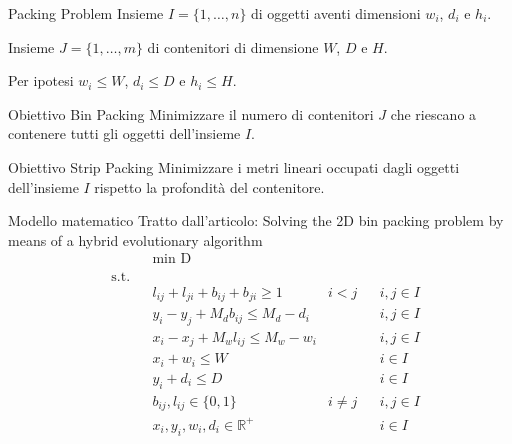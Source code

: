 \documentclass{beamer}
\begin{document}
\begin{frame}{Packing Problem}
	Insieme $I = \{1,\dots,n\}$ di oggetti aventi dimensioni $w_{i}$, $d_{i}$ e $h_{i}$.	
															
	Insieme $J = \{1,\dots,m\}$ di contenitori di dimensione $W$, $D$ e $H$.
													
	Per ipotesi $w_{i} \leq W$, $d_{i} \leq D$ e $h_{i} \leq H$.
	\vspace{.5em}
	\begin{minipage}[c]{0.45\textwidth}
		\begin{alertblock}{Obiettivo Bin Packing}
			Minimizzare il numero di contenitori $J$ che riescano a contenere tutti gli oggetti dell'insieme $I$.
		\end{alertblock}	
	\end{minipage}
	\hfill
	\begin{minipage}[c]{0.45\textwidth}
		\begin{alertblock}{Obiettivo Strip Packing}
			Minimizzare i metri lineari occupati dagli oggetti dell'insieme $I$ rispetto la profondit\`a del contenitore.
		\end{alertblock}	
	\end{minipage}
\end{frame}


\begin{frame}{Modello matematico}
	Tratto dall'articolo: Solving the 2D bin packing problem by means of a hybrid evolutionary algorithm
	\begin{align*}
		& & &\underset{}{\text{min D}} \\
		& \text{s.t.} \\
		  &   &   & l_{ij} + l_{ji} + b_{ij} + b_{ji} \geq 1      & i < j    &   & i,j \in I \\
		  &   &   & y_i - y_j + M_d b_{ij} \leq M_d - d_i         &          &   & i,j \in I \\
		  &   &   & x_i - x_j + M_w l_{ij} \leq M_w - w_i         &          &   & i,j \in I \\
		  &   &   & x_i + w_i \leq W                              &          &   & i \in I   \\
		  &   &   & y_i + d_i \leq D                              &          &   & i \in I   \\
		  &   &   & b_{ij}, l_{ij} \in \{0,1\}                    & i \neq j &   & i,j \in I \\
		  &   &   & x_{i}, y_{i}, w_{i}, d_{i} \in \mathbb{R}^{+} &          &   & i \in I   
	\end{align*}
\end{frame}
\end{document}
